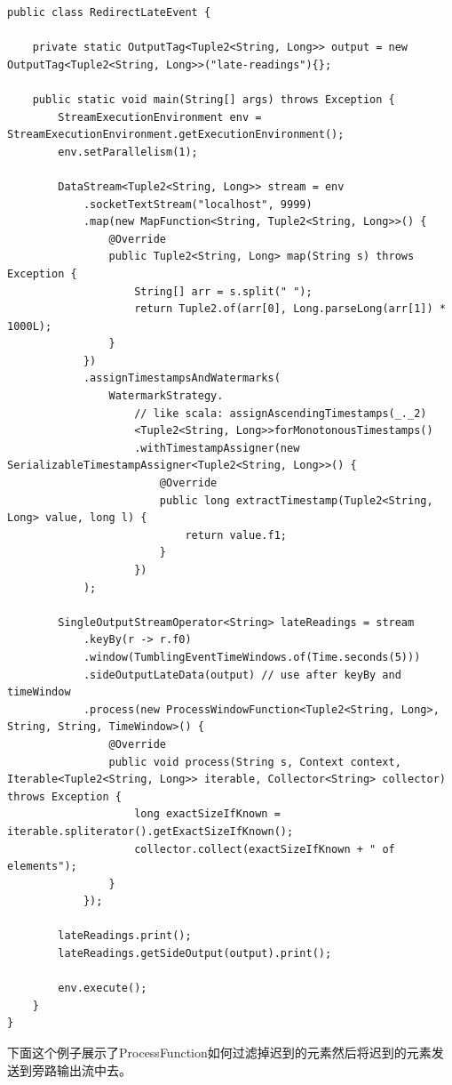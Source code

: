 \documentclass[cn,11pt,chinese]{elegantbook}
\begin{document}
\begin{verbatim}
public class RedirectLateEvent {

    private static OutputTag<Tuple2<String, Long>> output = new OutputTag<Tuple2<String, Long>>("late-readings"){};

    public static void main(String[] args) throws Exception {
        StreamExecutionEnvironment env = StreamExecutionEnvironment.getExecutionEnvironment();
        env.setParallelism(1);

        DataStream<Tuple2<String, Long>> stream = env
            .socketTextStream("localhost", 9999)
            .map(new MapFunction<String, Tuple2<String, Long>>() {
                @Override
                public Tuple2<String, Long> map(String s) throws Exception {
                    String[] arr = s.split(" ");
                    return Tuple2.of(arr[0], Long.parseLong(arr[1]) * 1000L);
                }
            })
            .assignTimestampsAndWatermarks(
                WatermarkStrategy.
                    // like scala: assignAscendingTimestamps(_._2)
                    <Tuple2<String, Long>>forMonotonousTimestamps()
                    .withTimestampAssigner(new SerializableTimestampAssigner<Tuple2<String, Long>>() {
                        @Override
                        public long extractTimestamp(Tuple2<String, Long> value, long l) {
                            return value.f1;
                        }
                    })
            );

        SingleOutputStreamOperator<String> lateReadings = stream
            .keyBy(r -> r.f0)
            .window(TumblingEventTimeWindows.of(Time.seconds(5)))
            .sideOutputLateData(output) // use after keyBy and timeWindow
            .process(new ProcessWindowFunction<Tuple2<String, Long>, String, String, TimeWindow>() {
                @Override
                public void process(String s, Context context, Iterable<Tuple2<String, Long>> iterable, Collector<String> collector) throws Exception {
                    long exactSizeIfKnown = iterable.spliterator().getExactSizeIfKnown();
                    collector.collect(exactSizeIfKnown + " of elements");
                }
            });

        lateReadings.print();
        lateReadings.getSideOutput(output).print();

        env.execute();
    }
}
\end{verbatim}

下面这个例子展示了ProcessFunction如何过滤掉迟到的元素然后将迟到的元素发送到旁路输出流中去。
\end{document}
